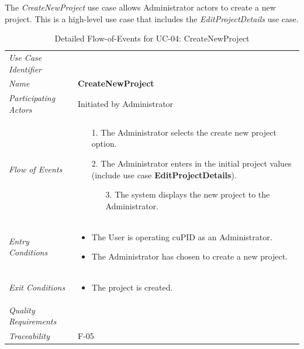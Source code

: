 \documentclass[12pt,letterpaper]{article}
\begin{document}
The {\it CreateNewProject} use case allows Administrator actors to create a new project. This is a high-level use case that includes the {\it EditProjectDetails} use case.

\begin{table}[H]
	\caption{Detailed Flow-of-Events for UC-04: CreateNewProject}
	\begin{tabu} to 
		\toprule
		Use Case Identifier & \createnewproject{} \\
		Name & {\bf CreateNewProject} \\
		Participating Actors & Initiated by Administrator \\
		Flow of Events & 
		\begin{minipage}[t]{\linewidth}
		    \begin{enumerate}
			    \item[1.] The Administrator selects the create new project option.
			    \item[2.] The Administrator enters in the initial project values (include use case \textbf{EditProjectDetails}).
			    \begin{enumerate}
				    \item[3.] The system displays the new project to the Administrator.
				\end{enumerate}
		    \end{enumerate}
	    \end{minipage} \\

		Entry Conditions &
		\begin{minipage}[t]{\linewidth}
			\begin{itemize}
			    \item The User is operating cuPID as an Administrator.
			    \item The Administrator has chosen to create a new project.
	        \end{itemize}
	    \end{minipage} \\

		Exit Conditions & 
		\begin{minipage}[t]{\linewidth}
			\begin{itemize}
			    \item The project is created.
	        \end{itemize}
	    \end{minipage}\\

		Quality Requirements & \\

		Traceability & F-05 \\
		\toprule
	\end{tabu}
\end{table}
\end{document}

